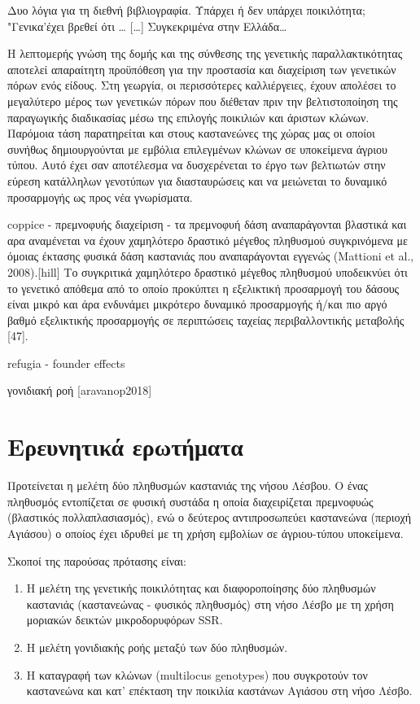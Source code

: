 \documentclass[12pt,a4paper,]{report}
\begin{document}
Δυο λόγια για τη διεθνή βιβλιογραφία. Υπάρχει ή δεν υπάρχει ποικιλότητα;
"Γενικα'έχει βρεθεί ότι \ldots{} {[}\ldots{}{]} Συγκεκριμένα στην
Ελλάδα\ldots{}

Η λεπτομερής γνώση της δομής και της σύνθεσης της γενετικής
παραλλακτικότητας αποτελεί απαραίτητη προϋπόθεση για την προστασία και
διαχείριση των γενετικών πόρων ενός είδους. Στη γεωργία, οι περισσότερες
καλλιέργειες, έχουν απολέσει το μεγαλύτερο μέρος των γενετικών πόρων που
διέθεταν πριν την βελτιστοποίηση της παραγωγικής διαδικασίας μέσω της
επιλογής ποικιλιών και άριστων κλώνων. Παρόμοια τάση παρατηρείται και
στους καστανεώνες της χώρας μας οι οποίοι συνήθως δημιουργούνται με
εμβόλια επιλεγμένων κλώνων σε υποκείμενα άγριου τύπου. Αυτό έχει σαν
αποτέλεσμα να δυσχερένεται το έργο των βελτιωτών στην εύρεση κατάλληλων
γενοτύπων για διασταυρώσεις και να μειώνεται το δυναμικό προσαρμογής ως
προς νέα γνωρίσματα.

coppice - πρεμνοφυής διαχείριση - τα πρεμνοφυή δάση αναπαράγονται
βλαστικά και αρα αναμένεται να έχουν χαμηλότερο δραστικό μέγεθος
πληθυσμού συγκρινόμενα με όμοιας έκτασης φυσικά δάση καστανιάς που
αναπαράγονται εγγενώς (Mattioni et al., 2008).{[}hill{]} Το συγκριτικά
χαμηλότερο δραστικό μέγεθος πληθυσμού υποδεικνύει ότι το γενετικό
απόθεμα από το οποίο προκύπτει η εξελικτική προσαρμογή του δάσους είναι
μικρό και άρα ενδυνάμει μικρότερο δυναμικό προσαρμογής ή/και πιο αργό
βαθμό εξελικτικής προσαρμογής σε περιπτώσεις ταχείας περιβαλλοντικής
μεταβολής {[}47{]}.

refugia - founder effects

γονιδιακή ροή {[}aravanop2018{]}

\hypertarget{-}{%
\section{Ερευνητικά ερωτήματα}\label{-}}

Προτείνεται η μελέτη δύο πληθυσμών καστανιάς της νήσου Λέσβου. Ο ένας
πληθυσμός εντοπίζεται σε φυσική συστάδα η οποία διαχειρίζεται πρεμνοφυώς
(βλαστικός πολλαπλασιασμός), ενώ ο δεύτερος αντιπροσωπεύει καστανεώνα
(περιοχή Αγιάσου) ο οποίος έχει ιδρυθεί με τη χρήση εμβολίων σε
άγριου-τύπου υποκείμενα.

Σκοποί της παρούσας πρότασης είναι:

\begin{enumerate}
\def\labelenumi{\arabic{enumi}.}
\item
  Η μελέτη της γενετικής ποικιλότητας και διαφοροποίησης δύο πληθυσμών
  καστανιάς (καστανεώνας - φυσικός πληθυσμός) στη νήσο Λέσβο με τη χρήση
  μοριακών δεικτών μικροδορυφόρων SSR.
\item
  Η μελέτη γονιδιακής ροής μεταξύ των δύο πληθυσμών.
\item
  Η καταγραφή των κλώνων (multilocus genotypes) που συγκροτούν τον
  καστανεώνα και κατ' επέκταση την ποικιλία καστάνων Αγιάσου στη νήσο
  Λέσβο.
\end{enumerate}
\end{document}

